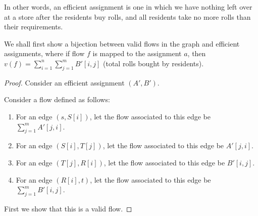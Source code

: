 \documentclass[answers]{exam}
\begin{document}
\begin{questions}
\begin{solution}
In other words, an efficient assignment is one in which we have nothing left over at a store after the residents buy rolls, and all residents take no more rolls than their requirements.

We shall first show a bijection between valid flows in the graph and efficient assignments, where if flow $f$ is mapped to the assignment $a$, then $v(f) = \sum_{i = 1}^n \sum_{j = 1}^m B'[i, j]$ (total rolls bought by residents).

\begin{proof}

Consider an efficient assignment $(A', B')$.

Consider a flow defined as follows:
\begin{enumerate}
    \item For an edge $(s, S[i])$, let the flow associated to this edge be $\sum_{j=1}^m A'[j, i]$.
    \item For an edge $(S[i], T[j])$, let the flow associated to this edge be $A'[j, i]$.
    \item For an edge $(T[j], R[i])$, let the flow associated to this edge be $B'[i, j]$.
    \item For an edge $(R[i], t)$, let the flow associated to this edge be $\sum_{j = 1}^m B'[i, j]$.
\end{enumerate}


First we show that this is a valid flow.


\end{proof}
\end{solution}
\end{questions}
\end{document}
